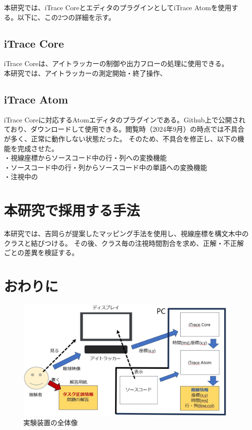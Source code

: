 \documentclass[paper=a4paper,fontsize=11pt]{jlreq}
\begin{document}
    本研究では、iTrace CoreとエディタのプラグインとしてiTrace Atomを使用する。以下に、この2つの詳細を示す。

    \subsection{iTrace Core}
      iTrace Coreは、アイトラッカーの制御や出力フローの処理に使用できる。\\
      本研究では、アイトラッカーの測定開始・終了操作、

    \subsection{iTrace Atom}
      iTrace Coreに対応するAtomエディタのプラグインである。Github上で公開されており、ダウンロードして使用できる。閲覧時（2024年9月）の時点では不具合が多く、正常に動作しない状態だった。
      そのため、不具合を修正し、以下の機能を完成させた。\\
      ・視線座標からソースコード中の行・列への変換機能\\
      ・ソースコード中の行・列からソースコード中の単語への変換機能\\
      ・注視中の
  \clearpage

  \section{本研究で採用する手法}
    本研究では、吉岡らが提案したマッピング手法を使用し、視線座標を構文木中のクラスと結びつける。
    その後、クラス毎の注視時間割合を求め、正解・不正解ごとの差異を検証する。
  \clearpage
  
  \section{おわりに}
    \begin{figure}[htbp]
      \centering
      \includegraphics[width=0.8\linewidth]{実験装置全体図.jpg}
      \caption{実験装置の全体像}
    \end{figure}
    \FloatBarrier
\end{document}
